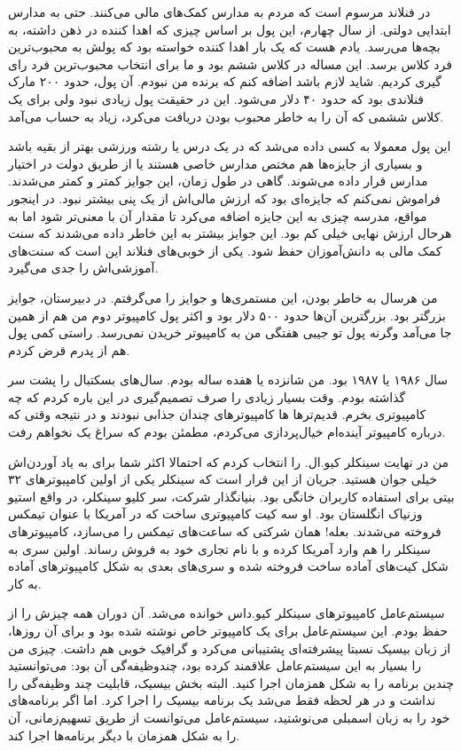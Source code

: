 در فنلاند مرسوم است که مردم به مدارس کمک‌های مالی می‌کنند. حتی به مدارس
ابتدایی دولتی. از سال چهارم، این پول بر اساس چیزی که اهدا کننده در ذهن
داشته، به بچه‌ها می‌رسد. یادم هست که یک بار اهدا کننده خواسته بود که
پولش به محبوب‌ترین فرد کلاس برسد. این مساله در کلاس ششم بود و ما برای
انتخاب محبوب‌ترین فرد رای گیری کردیم. شاید لازم باشد اضافه کنم که برنده
من نبودم. آن پول، حدود ۲۰۰ مارک فنلاندی بود که حدود ۴۰ دلار می‌شود. این
در حقیقت پول زیادی نبود ولی برای یک کلاس ششمی که آن را به خاطر محبوب
بودن دریافت می‌کرد، زیاد به حساب می‌آمد.

این پول معمولا به کسی داده می‌شد که در یک درس یا رشته ورزشی بهتر از
بقیه باشد و بسیاری از جایزه‌ها هم مختص مدارس خاصی هستند یا از طریق دولت
در اختیار مدارس قرار داده می‌شوند. گاهی در طول زمان، این جوایز کمتر و
کمتر می‌شدند. فراموش نمی‌کنم که جایزه‌ای بود که ارزش مالی‌اش از یک پنی
بیشتر نبود. در اینجور مواقع،‌ مدرسه چیزی به این جایزه اضافه می‌کرد تا
مقدار آن با معنی‌تر شود اما به هرحال ارزش نهایی خیلی کم بود. این جوایز
بیشتر به این خاطر داده می‌شدند که سنت کمک مالی به دانش‌آموزان حفظ
شود. یکی از خوبی‌های فنلاند این است که سنت‌های آموزشی‌اش را جدی می‌گیرد.

من هرسال به خاطر  بودن، این مستمری‌ها و جوایز را
می‌گرفتم. در دبیرستان، جوایز بزرگتر بود. بزرگترین آن‌ها حدود ۵۰۰ دلار
بود و اکثر پول کامپیوتر دوم من هم از همین جا می‌آمد وگرنه پول تو جیبی‌
هفتگی من به کامپیوتر خریدن نمی‌رسد. راستی کمی پول هم از پدرم قرض کردم.

سال ۱۹۸۶ یا ۱۹۸۷ بود. من شانزده یا هفده ساله بودم. سال‌های بسکتبال را
پشت سر گذاشته بودم. وقت بسیار زیادی را صرف تصمیم‌گیری در این باره کردم
که چه کامپیوتری بخرم. قدیم‌‌ترها ها کامپیوترهای چندان جذابی نبودند و
در نتیجه وقتی که درباره کامپیوتر آینده‌ام خیال‌پردازی می‌کردم، مطمئن بودم
که سراغ یک  نخواهم رفت.

من در نهایت سینکلر کیو.ال. را انتخاب کردم که
احتمالا اکثر شما برای به یاد آوردن‌اش خیلی جوان هستید. جریان از این
قرار است که سینکلر یکی از اولین کامپیوترهای ۳۲ بیتی برای استفاده
کاربران خانگی بود. بنیانگذار شرکت، سر کلیو سینکلر،‌ در واقع استیو وزنیاک انگلستان بود. او سه کیت کامپیوتری
ساخت که در آمریکا با عنوان تیمکس فروخته
می‌شدند. بعله!‌ همان شرکتی که ساعت‌های تیمکس را می‌سازد، کامپیوترهای
سینکلر را هم وارد آمریکا کرده و با نام تجاری خود به فروش رساند. اولین
سری به شکل کیت‌‌های آماده ساخت فروخته شده و سری‌های بعدی به شکل
کامپیوترهای آماده به کار.

سیستم‌عامل کامپیوترهای سینکلر کیو.داس خوانده می‌شد. آن دوران همه چیزش را
از حفظ بودم. این سیستم‌عامل برای یک کامپیوتر خاص نوشته شده بود و برای
آن روزها، از زبان بیسیک نسبتا پیشرفته‌ای پشتیبانی می‌کرد و گرافیک خوبی
هم داشت. چیزی من را بسیار به این سیستم‌عامل علاقمند کرده بود،
چندوظیفه‌گی آن بود: می‌توانستید چندین برنامه را به
شکل همزمان اجرا کنید. البته بخش بیسیک، قابلیت چند وظیفه‌گی را نداشت و
در هر لحظه فقط می‌شد یک برنامه بیسیک را اجرا کرد. اما اگر برنامه‌های خود
را به زبان اسمبلی می‌نوشتید، سیستم‌عامل می‌توانست از طریق تسهیم‌زمانی، آن
را به شکل همزمان با دیگر برنامه‌ها اجرا کند.


